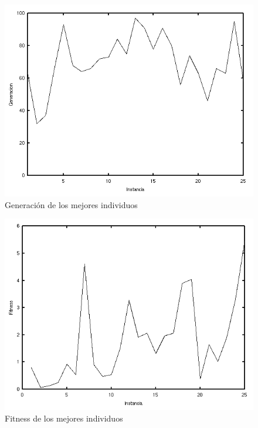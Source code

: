 \documentclass[journal]{IEEEtran}
\begin{document}
\begin{figure}[h]
\centering
\includegraphics[width=\linewidth]{generations.png}
\caption{Generación de los mejores individuos}
\label{fig:generations}
\end{figure}

\begin{figure}[h]
\centering
\includegraphics[width=\linewidth]{fitness.png}
\caption{Fitness de los mejores individuos}
\label{fig:fitness}
\end{figure}
\end{document}
